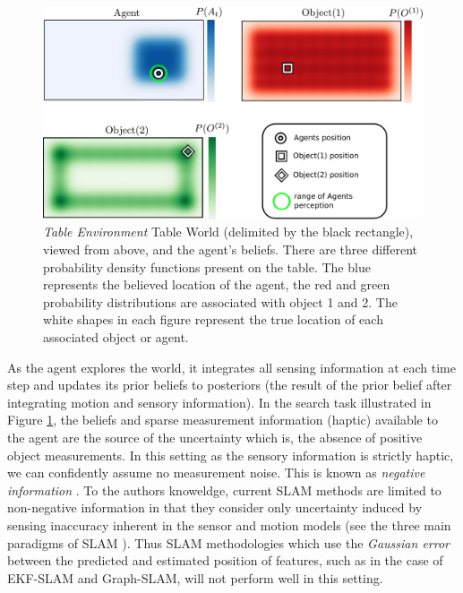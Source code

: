 \begin{figure}
  \centering
  \includegraphics[width=0.95\linewidth]{./ch5-MLMF/Figures/Figure1_v2.pdf}
  \caption{ \textit{Table Environment} Table World (delimited by the black rectangle), viewed from above, and the agent's beliefs. 
  There are three different probability density functions present on the table. 
  The blue represents the believed location of the agent, the red and green probability distributions are associated with object 1 and 2.
  The white shapes in each figure represent the true location of each associated object or agent.}
  \label{fig:Figure1}
\end{figure}
\vspace*{0.6cm}



As the agent explores the world, it integrates all sensing information at each time step and updates its prior beliefs to posteriors
(the result of the prior belief after integrating motion and sensory information).
In the search task illustrated in Figure \ref{fig:Figure1}, the beliefs and sparse measurement information (haptic) available to the agent are 
the source of the uncertainty which is, the absence of positive object measurements. In this setting as the sensory information is strictly haptic, 
we can confidently assume no measurement noise. 
This is known as \textit{negative information} \citep[p.313]{Thrun_Burgard_Fox_2005} \citep{Thrun02particlefilters,negative_info_markov_localisation}. 
To the authors knoweldge, current SLAM methods are limited to non-negative information in that they consider only uncertainty induced by sensing inaccuracy inherent in 
the sensor and motion models (see the three main paradigms of SLAM \cite[Chap. 10-13]{Thrun_Burgard_Fox_2005}). 
Thus SLAM methodologies which use the \textit{Gaussian error} between the predicted and estimated position of features, such as in the case 
of EKF-SLAM and Graph-SLAM, will not perform well in this setting. 

